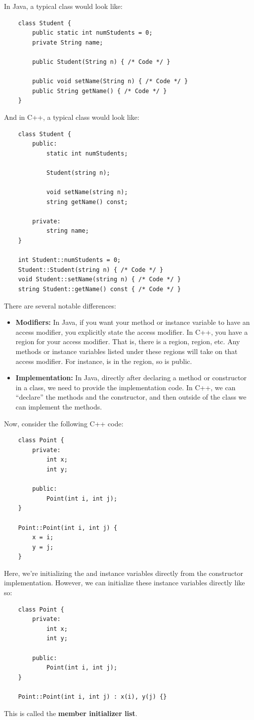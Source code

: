 \documentclass[letterpaper]{article}
\begin{document}
In Java, a typical class would look like: 
\begin{verbatim}
    class Student {
        public static int numStudents = 0;
        private String name; 
        
        public Student(String n) { /* Code */ }

        public void setName(String n) { /* Code */ }
        public String getName() { /* Code */ }
    }
\end{verbatim}

And in C++, a typical class would look like: 
\begin{verbatim}
    class Student {
        public: 
            static int numStudents; 

            Student(string n);
            
            void setName(string n);
            string getName() const; 

        private: 
            string name; 
    }

    int Student::numStudents = 0;
    Student::Student(string n) { /* Code */ }
    void Student::setName(string n) { /* Code */ }
    string Student::getName() const { /* Code */ }
\end{verbatim}

There are several notable differences: 
\begin{itemize}
    \item \textbf{Modifiers:} In Java, if you want your method or instance variable to have an access modifier, you explicitly state the access modifier. In C++, you have a region for your access modifier. That is, there is a  region,  region, etc. Any methods or instance variables listed under these regions will take on that access modifier. For instance,  is in the  region, so  is public.
    \item \textbf{Implementation:} In Java, directly after declaring a method or constructor in a class, we need to provide the implementation code. In C++, we can ``declare'' the methods and the constructor, and then outside of the class we can implement the methods.
\end{itemize}
Now, consider the following C++ code: 
\begin{verbatim}
    class Point {
        private: 
            int x; 
            int y;
        
        public:
            Point(int i, int j);
    }

    Point::Point(int i, int j) {
        x = i;
        y = j;
    }
\end{verbatim}
Here, we're initializing the  and  instance variables directly from the constructor implementation. However, we can initialize these instance variables directly like so: 
\begin{verbatim}
    class Point {
        private: 
            int x; 
            int y;
        
        public:
            Point(int i, int j);
    }

    Point::Point(int i, int j) : x(i), y(j) {}
\end{verbatim}
This is called the \textbf{member initializer list}.
\end{document}
